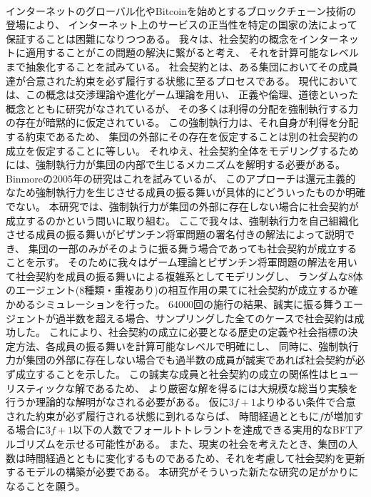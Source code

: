 ~ \\
  インターネットのグローバル化やBitcoin\cite{nakamoto2008bitcoin}を始めとするブロックチェーン技術の登場により、
  インターネット上のサービスの正当性を特定の国家の法によって保証することは困難になりつつある。
  我々は、社会契約の概念をインターネットに適用することがこの問題の解決に繋がると考え、
  それを計算可能なレベルまで抽象化することを試みている。
  社会契約とは、ある集団においてその成員達が合意された約束を必ず履行する状態に至るプロセスである。
  現代においては、この概念は交渉理論や進化ゲーム理論を用い、
  正義や倫理、道徳といった概念とともに研究がなされている\cite{sep-game-ethics}が、
  その多くは利得の分配を強制執行する力の存在が暗黙的に仮定されている。
  この強制執行力は、それ自身が利得を分配する約束であるため、
  集団の外部にその存在を仮定することは別の社会契約の成立を仮定することに等しい。
  それゆえ、社会契約全体をモデリングするためには、強制執行力が集団の内部で生じるメカニズムを解明する必要がある。
  Binmoreの2005年の研究\cite{binmore2005}はこれを試みているが、
  このアプローチは還元主義的なため強制執行力を生じさせる成員の振る舞いが具体的にどういったものか明確でない。
  本研究では、強制執行力が集団の外部に存在しない場合に社会契約が成立するのかという問いに取り組む。
  ここで我々は、強制執行力を自己組織化させる成員の振る舞いがビザンチン将軍問題の署名付きの解法\cite{lamport1982}によって説明でき、
  集団の一部のみがそのように振る舞う場合であっても社会契約が成立することを示す。
  そのために我々はゲーム理論とビザンチン将軍問題の解法を用いて社会契約を成員の振る舞いによる複雑系としてモデリングし、
  ランダムな8体のエージェント(8種類・重複あり)の相互作用の果てに社会契約が成立するか確かめるシミュレーションを行った。
  64000回の施行の結果、誠実に振る舞うエージェントが過半数を超える場合、サンプリングした全てのケースで社会契約は成功した。
  これにより、社会契約の成立に必要となる歴史の定義や社会指標の決定方法、各成員の振る舞いを計算可能なレベルで明確にし、
  同時に、強制執行力が集団の外部に存在しない場合でも過半数の成員が誠実であれば社会契約が必ず成立することを示した。
  この誠実な成員と社会契約の成立の関係性はヒューリスティックな解であるため、
  より厳密な解を得るには大規模な総当り実験を行うか理論的な解明がなされる必要がある。
  仮に$3f+1$よりゆるい条件で合意された約束が必ず履行される状態に到れるならば、
  時間経過とともに$f$が増加する場合に$3f+1$以下の人数でフォールトトレラントを達成できる実用的なBFTアルゴリズムを示せる可能性がある。
  また、現実の社会を考えたとき、集団の人数は時間経過とともに変化するものであるため、それを考慮して社会契約を更新するモデルの構築が必要である。
  本研究がそういった新たな研究の足がかりになることを願う。
~ \\